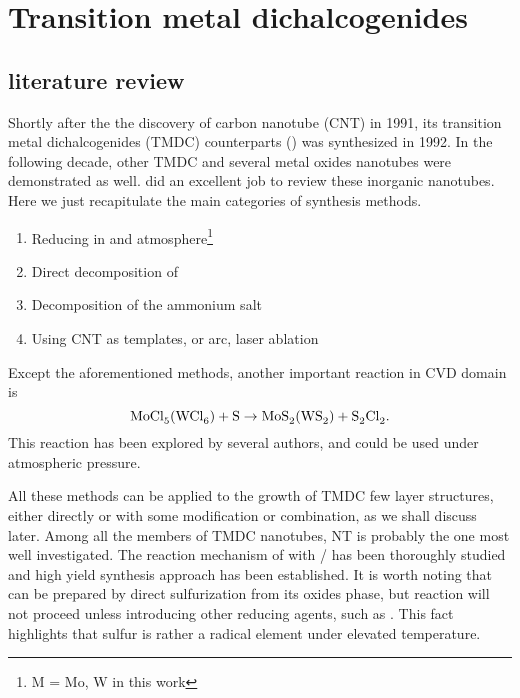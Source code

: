 
\chapter{Transition metal dichalcogenides}

\section{literature review}


Shortly after the the discovery of carbon nanotube (CNT) in 1991, its transition metal dichalcogenides (TMDC) counterparts () was synthesized in 1992. In the following decade, other TMDC and several metal oxides nanotubes were demonstrated as well. \citeauthor{Rao2003} did an excellent job to review these inorganic nanotubes.\cite{Rao2003} Here we just recapitulate the main categories of synthesis methods. 
\begin{enumerate}
\item Reducing  in  and  atmosphere\footnote{M = Mo, W in this work}
\item Direct decomposition of 
\item Decomposition of the ammonium salt 
\item Using CNT as templates, or arc, laser ablation
\end{enumerate}

Except the aforementioned methods, another important reaction in CVD domain is
\[
\cee{MoCl5(WCl6) + S \rightarrow MoS2(WS2) + S2Cl2}.
\]
This reaction has been explored by several authors,\cite{Stoffels1999} and could be used under atmospheric pressure.\cite{Li2004a}

All these methods can be applied to the growth of TMDC few layer structures, either directly or with some modification or combination, as we shall discuss later. Among all the members of TMDC nanotubes,  NT is probably the one most well investigated.\cite{Tenne1998,Frey1998,Frey1999,Rothschild2000,Zak2000} The reaction mechanism of  with / has been thoroughly studied \cite{Feldman1998} and high yield synthesis approach has been established.\cite{Margolin2004}
It is worth noting that  can be prepared by direct sulfurization from its oxides phase, but reaction  will not proceed unless introducing other reducing agents, such as .\cite{Tsirlina1998} This fact highlights that sulfur is rather a radical element under elevated temperature.
 
